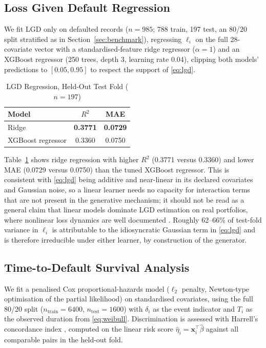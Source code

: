 \documentclass[journal]{IEEEtran}
\begin{document}
\subsection{Loss Given Default Regression}
We fit LGD only on defaulted records ($n=985$; 788 train, 197 test, an 80/20 split stratified as in Section~\ref{sec:benchmark}), regressing $\ell_i$ on the full 28-covariate vector with a standardised-feature ridge regressor ($\alpha=1$) and an XGBoost regressor (250 trees, depth 3, learning rate 0.04), clipping both models' predictions to $[0.05,0.95]$ to respect the support of \eqref{eq:lgd}.

\begin{table}[!t]
\caption{LGD Regression, Held-Out Test Fold ($n=197$)}
\label{tab:lgd}
\centering
\footnotesize
\begin{tabular}{@{}lcc@{}}
\toprule
Model & $R^2$ & MAE \\
\midrule
Ridge & \textbf{0.3771} & \textbf{0.0729} \\
XGBoost regressor & 0.3360 & 0.0750 \\
\bottomrule
\end{tabular}
\end{table}

Table~\ref{tab:lgd} shows ridge regression with higher $R^2$ (0.3771 versus 0.3360) and lower MAE (0.0729 versus 0.0750) than the tuned XGBoost regressor. This is consistent with \eqref{eq:lgd} being additive and near-linear in its declared covariates and Gaussian noise, so a linear learner needs no capacity for interaction terms that are not present in the generative mechanism; it should not be read as a general claim that linear models dominate LGD estimation on real portfolios, where nonlinear loss dynamics are well documented \cite{smaragdakis2021lgd}. Roughly 62--66\% of test-fold variance in $\ell_i$ is attributable to the idiosyncratic Gaussian term in \eqref{eq:lgd} and is therefore irreducible under either learner, by construction of the generator.

\subsection{Time-to-Default Survival Analysis}
We fit a penalised Cox proportional-hazards model ($\ell_2$ penalty, Newton-type optimisation of the partial likelihood) on standardised covariates, using the full 80/20 split ($n_{\text{train}}=6400$, $n_{\text{test}}=1600$) with $\delta_i$ as the event indicator and $T_i$ as the observed duration from \eqref{eq:weibull}. Discrimination is assessed with Harrell's concordance index \cite{harrell1982cindex}, computed on the linear risk score $\hat\eta_i=\mathbf{x}_i^\top\hat\beta$ against all comparable pairs in the held-out fold.
\end{document}

